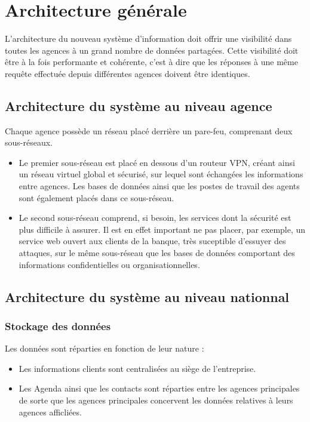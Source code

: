 
\section{Architecture générale}


L'architecture du nouveau système d'information doit offrir une visibilité dans toutes les agences à un grand nombre de données partagées. Cette visibilité doit être à la fois performante et cohérente, c'est à dire que les réponses à une même requête effectuée depuis différentes agences doivent être identiques.

\subsection{Architecture du système au niveau agence}

Chaque agence possède un réseau placé derrière un pare-feu, comprenant deux sous-réseaux.
\begin{itemize}
  \item Le premier sous-réseau est placé en dessous d'un routeur VPN, créant ainsi un réseau virtuel global et sécurisé, sur lequel sont échangées les informations entre agences. Les bases de données ainsi que les postes de travail des agents sont également placés dans ce sous-réseau.
  \item Le second sous-réseau comprend, si besoin, les services dont la sécurité est plus difficile à assurer. Il est en effet important ne pas placer, par exemple, un service web ouvert aux clients de la banque, très suceptible d'essuyer des attaques, sur le même sous-réseau que les bases de données comportant des informations confidentielles ou organisationnelles. 
\end{itemize}


\subsection{Architecture du système au niveau nationnal}
\subsubsection{ Stockage des données }

Les données sont réparties en fonction de leur nature :
\begin{itemize}
  \item Les informations clients sont centralisées au siège de l'entreprise.
  \item Les Agenda ainsi que les contacts sont réparties entre les agences principales de sorte que les agences principales concervent les données relatives à leurs agences afficliées.
\end{itemize}
  
